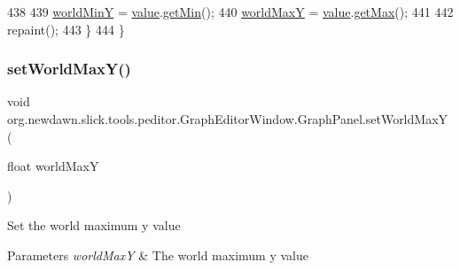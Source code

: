 \begin{DoxyCode}
438 
439                 \mbox{\hyperlink{classorg_1_1newdawn_1_1slick_1_1tools_1_1peditor_1_1_graph_editor_window_1_1_graph_panel_ad95df88110fd1b220a1fbe80850f84b4}{worldMinY}} = \mbox{\hyperlink{classorg_1_1newdawn_1_1slick_1_1tools_1_1peditor_1_1_graph_editor_window_1_1_graph_panel_a251a328f85d3f44ea54d13ce658446f9}{value}}.\mbox{\hyperlink{classorg_1_1newdawn_1_1slick_1_1particles_1_1_configurable_emitter_1_1_linear_interpolator_a564cab8dc7718f08c588976c6190765b}{getMin}}();
440                 \mbox{\hyperlink{classorg_1_1newdawn_1_1slick_1_1tools_1_1peditor_1_1_graph_editor_window_1_1_graph_panel_a9b7733b23535ca22b1cbdb029587dcfe}{worldMaxY}} = \mbox{\hyperlink{classorg_1_1newdawn_1_1slick_1_1tools_1_1peditor_1_1_graph_editor_window_1_1_graph_panel_a251a328f85d3f44ea54d13ce658446f9}{value}}.\mbox{\hyperlink{classorg_1_1newdawn_1_1slick_1_1particles_1_1_configurable_emitter_1_1_linear_interpolator_aebd1988ffcec1a5b4a42ff9bdf2328d7}{getMax}}();
441 
442                 repaint();
443             \}
444         \}
\end{DoxyCode}
\mbox{\label{classorg_1_1newdawn_1_1slick_1_1tools_1_1peditor_1_1_graph_editor_window_1_1_graph_panel_a8fac1c36ce2ca55000ca3a2373c3f635}} 
\subsubsection{\texorpdfstring{set\+World\+Max\+Y()}{setWorldMaxY()}}
{\footnotesize\ttfamily void org.\+newdawn.\+slick.\+tools.\+peditor.\+Graph\+Editor\+Window.\+Graph\+Panel.\+set\+World\+MaxY (\begin{DoxyParamCaption}\item[{float}]{world\+MaxY }\end{DoxyParamCaption})\hspace{0.3cm}{\ttfamily [inline]}}

Set the world maximum y value


\begin{DoxyParams}{Parameters}
{\em world\+MaxY} & The world maximum y value \\
\hline
\end{DoxyParams}

